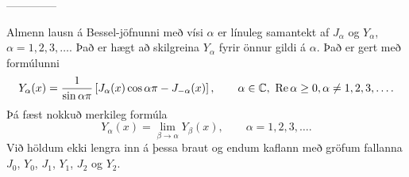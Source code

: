 --------------




Almenn lausn á Bessel-jöfnunni með vísi ${\alpha}$ er línuleg samantekt
af $J_{\alpha}$ og $Y_{\alpha}$, ${\alpha}=1,2,3,\dots$. Það er hægt að
skilgreina $Y_{\alpha}$ fyrir önnur gildi á ${\alpha}$.  Það er
gert með formúlunni
$$
Y_{\alpha}(x)=\dfrac 1{\sin {\alpha}{\pi}}\left[
J_{\alpha}(x)\cos{\alpha}{\pi} -J_{-{\alpha}}(x)
\right], \qquad {\alpha}\in {\mathbb C}, \ {\operatorname{Re\, }} {\alpha}\geq 0, {\alpha}\neq
1,2,3,\dots. 
$$
Þá fæst nokkuð merkileg formúla
$$
Y_{\alpha}(x)=\lim_{{\beta}\to {\alpha}} Y_{\beta}(x), \qquad 
{\alpha}=1,2,3,\dots .
$$
Við  höldum ekki lengra inn á þessa braut og endum kaflann
 með gröfum fallanna 
$J_0$, $Y_0$, $J_1$, $Y_1$, $J_2$ og  $Y_2$. 





